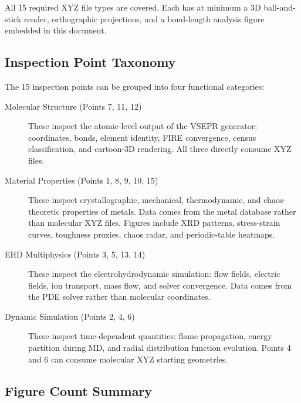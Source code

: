 \documentclass[11pt,a4paper]{article}
\begin{document}
\noindent All 15 required XYZ file types are covered.  Each has at
minimum a 3D ball-and-stick render, orthographic projections, and a
bond-length analysis figure embedded in this document.

\subsection{Inspection Point Taxonomy}

The 15 inspection points can be grouped into four functional categories:

\begin{description}
  \item[Molecular Structure (Points 7, 11, 12)]
    These inspect the atomic-level output of the VSEPR generator:
    coordinates, bonds, element identity, FIRE convergence, census
    classification, and cartoon-3D rendering.  All three directly
    consume XYZ files.

  \item[Material Properties (Points 1, 8, 9, 10, 15)]
    These inspect crystallographic, mechanical, thermodynamic, and
    chaos-theoretic properties of metals.  Data comes from the metal
    database rather than molecular XYZ files.  Figures include XRD
    patterns, stress-strain curves, toughness proxies, chaos radar,
    and periodic-table heatmaps.

  \item[EHD Multiphysics (Points 3, 5, 13, 14)]
    These inspect the electrohydrodynamic simulation: flow fields,
    electric fields, ion transport, mass flow, and solver convergence.
    Data comes from the PDE solver rather than molecular coordinates.

  \item[Dynamic Simulation (Points 2, 4, 6)]
    These inspect time-dependent quantities: flame propagation, energy
    partition during MD, and radial distribution function evolution.
    Points 4 and 6 can consume molecular XYZ starting geometries.
\end{description}

\subsection{Figure Count Summary}
\end{document}
